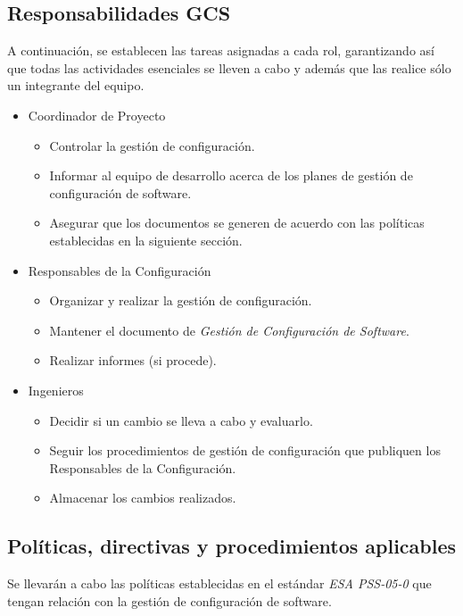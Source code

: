 \documentclass[11pt, a4paper, twoside, titlepage]{article}
\begin{document}
		\subsection{Responsabilidades GCS}
			A continuación, se establecen las tareas asignadas a cada rol, garantizando así que todas las actividades esenciales se lleven a cabo y además que las realice sólo un integrante del equipo.
			\begin{itemize}
				\item Coordinador de Proyecto
					\begin{itemize}
						\item Controlar la gestión de configuración.
						\item Informar al equipo de desarrollo acerca de los planes de gestión de configuración de software.
						\item Asegurar que los documentos se generen de acuerdo con las políticas establecidas en la siguiente sección.
					\end{itemize}
				\item Responsables de la Configuración
					\begin{itemize}
						\item Organizar y realizar la gestión de configuración.
						\item Mantener el documento de \textit{Gestión de Configuración de Software}.
						\item Realizar informes (si procede).
					\end{itemize}
				\item Ingenieros
					\begin{itemize}
						\item Decidir si un cambio se lleva a cabo y evaluarlo.
						\item Seguir los procedimientos de gestión de configuración que publiquen los Responsables de la Configuración.
						\item Almacenar los cambios realizados.
					\end{itemize}
			\end{itemize}

		\subsection{Políticas, directivas y procedimientos aplicables}
			Se llevarán a cabo las políticas establecidas en el estándar \textit{ESA PSS-05-0} \cite{ESAPSS-05-0} que tengan relación con la gestión de configuración de software. \\
\end{document}
